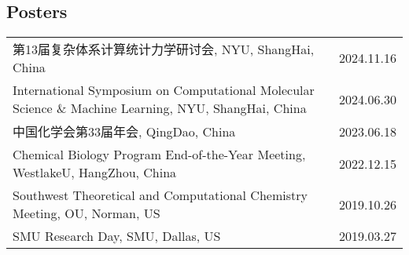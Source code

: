 \documentclass{article}
\begin{document}
\subsection*{Posters}
\begin{tabularx}{\linewidth}{Xr}
第13届复杂体系计算统计力学研讨会, NYU, ShangHai, China                                                   & 2024.11.16 \\
International Symposium on Computational Molecular Science \& Machine Learning, NYU, ShangHai, China  & 2024.06.30 \\
中国化学会第33届年会, QingDao, China                                          & 2023.06.18 \\
Chemical Biology Program End-of-the-Year Meeting, WestlakeU, HangZhou, China                          & 2022.12.15 \\
Southwest Theoretical and Computational Chemistry Meeting, OU, Norman, US                             & 2019.10.26 \\
SMU Research Day, SMU, Dallas, US                                                                     & 2019.03.27
\end{tabularx}
\end{document}
